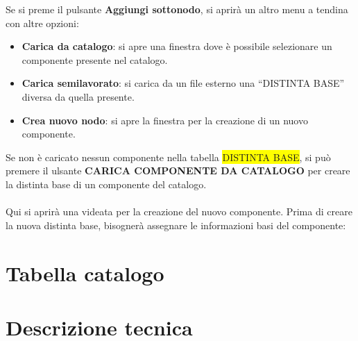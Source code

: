 \documentclass[a4paper,12pt]{book}
\begin{document}
\bigskip
Se si preme il pulsante \textbf{Aggiungi sottonodo}, si aprirà un altro menu a tendina con altre opzioni:

\begin{itemize}
	\item \textbf{Carica da catalogo}: si apre una finestra dove è possibile selezionare un componente presente nel catalogo.
	\item \textbf{Carica semilavorato}: si carica da un file esterno una “DISTINTA BASE” diversa da quella presente.
	\item \textbf{Crea nuovo nodo}: si apre la finestra per la creazione di un nuovo componente.
	       
	          
\end{itemize}

Se non è caricato nessun componente nella tabella \colorbox{yellow}{DISTINTA BASE}, si può premere il ulsante \textbf{CARICA COMPONENTE DA CATALOGO} per creare la distinta base di un componente del catalogo.\\
\\Qui si aprirà una videata per la creazione del nuovo componente.
Prima di creare la nuova distinta base, bisognerà assegnare le informazioni basi del componente:

\section{Tabella catalogo}
\section{Descrizione tecnica}
\end{document}
